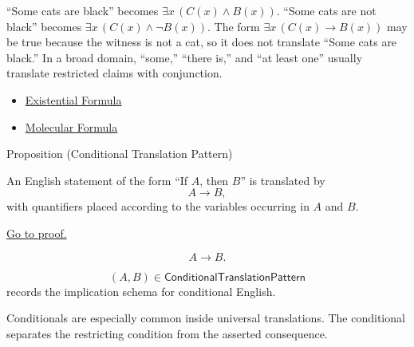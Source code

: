\begin{remark*}[Exposition]
``Some cats are black'' becomes \(\exists x\,(C(x)\land B(x))\). ``Some cats are
not black'' becomes \(\exists x\,(C(x)\land \neg B(x))\). The form
\(\exists x\,(C(x)\to B(x))\) may be true because the witness is not a cat, so
it does not translate ``Some cats are black.'' In a broad domain, ``some,''
``there is,'' and ``at least one'' usually translate restricted claims with
conjunction.
\end{remark*}

\begin{dependencies}
\begin{itemize}
  \item \hyperref[def:existential-q]{Existential Formula}
  \item \hyperref[def:molecular]{Molecular Formula}
\end{itemize}
\end{dependencies}

\begin{propositionbox}{Proposition (Conditional Translation Pattern)}
\begin{proposition}
\label{prop:conditional-translation-pattern}
An English statement of the form ``If \(A\), then \(B\)'' is translated by
\[
A\to B,
\]
with quantifiers placed according to the variables occurring in \(A\) and \(B\).

\noindent\hyperref[prf:conditional-translation-pattern]{Go to proof.}
\end{proposition}
\end{propositionbox}

\begin{remark*}
\[
A\to B.
\]
\end{remark*}

\begin{remark*}
\[
  (A,B)\in\mathsf{ConditionalTranslationPattern}
\] records the implication
schema for conditional English.
\end{remark*}

\begin{remark*}[Interpretation]
Conditionals are especially common inside universal translations. The
conditional separates the restricting condition from the asserted consequence.
\end{remark*}

